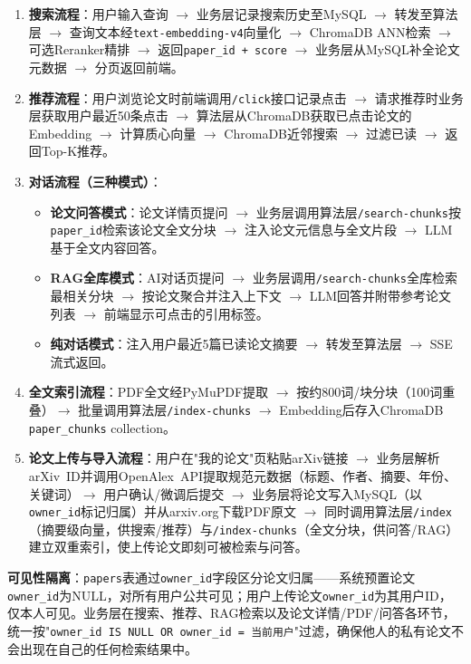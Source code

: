 \documentclass[12pt,a4paper]{ctexart}
\newcommand{\code}[1]{\texttt{#1}}
\newcommand{\api}[1]{\texttt{#1}}
\begin{document}
\begin{enumerate}
\item \textbf{搜索流程}：用户输入查询 $\to$ 业务层记录搜索历史至MySQL $\to$ 转发至算法层 $\to$ 查询文本经\code{text-embedding-v4}向量化 $\to$ ChromaDB ANN检索 $\to$ 可选Reranker精排 $\to$ 返回\code{paper\_id + score} $\to$ 业务层从MySQL补全论文元数据 $\to$ 分页返回前端。

\item \textbf{推荐流程}：用户浏览论文时前端调用\api{/click}接口记录点击 $\to$ 请求推荐时业务层获取用户最近50条点击 $\to$ 算法层从ChromaDB获取已点击论文的Embedding $\to$ 计算质心向量 $\to$ ChromaDB近邻搜索 $\to$ 过滤已读 $\to$ 返回Top-K推荐。

\item \textbf{对话流程（三种模式）}：
  \begin{itemize}
  \item \textbf{论文问答模式}：论文详情页提问 $\to$ 业务层调用算法层\api{/search-chunks}按\code{paper\_id}检索该论文全文分块 $\to$ 注入论文元信息与全文片段 $\to$ LLM基于全文内容回答。
  \item \textbf{RAG全库模式}：AI对话页提问 $\to$ 业务层调用\api{/search-chunks}全库检索最相关分块 $\to$ 按论文聚合并注入上下文 $\to$ LLM回答并附带参考论文列表 $\to$ 前端显示可点击的引用标签。
  \item \textbf{纯对话模式}：注入用户最近5篇已读论文摘要 $\to$ 转发至算法层 $\to$ SSE流式返回。
  \end{itemize}

\item \textbf{全文索引流程}：PDF全文经PyMuPDF提取 $\to$ 按约800词/块分块（100词重叠）$\to$ 批量调用算法层\api{/index-chunks} $\to$ Embedding后存入ChromaDB \code{paper\_chunks} collection。

\item \textbf{论文上传与导入流程}：用户在"我的论文"页粘贴arXiv链接 $\to$ 业务层解析arXiv~ID并调用OpenAlex~API提取规范元数据（标题、作者、摘要、年份、关键词）$\to$ 用户确认/微调后提交 $\to$ 业务层将论文写入MySQL（以\code{owner\_id}标记归属）并从arxiv.org下载PDF原文 $\to$ 同时调用算法层\api{/index}（摘要级向量，供搜索/推荐）与\api{/index-chunks}（全文分块，供问答/RAG）建立双重索引，使上传论文即刻可被检索与问答。
\end{enumerate}

\textbf{可见性隔离}：\code{papers}表通过\code{owner\_id}字段区分论文归属——系统预置论文\code{owner\_id}为NULL，对所有用户公共可见；用户上传论文\code{owner\_id}为其用户ID，仅本人可见。业务层在搜索、推荐、RAG检索以及论文详情/PDF/问答各环节，统一按"\code{owner\_id IS NULL OR owner\_id = 当前用户}"过滤，确保他人的私有论文不会出现在自己的任何检索结果中。
\end{document}
